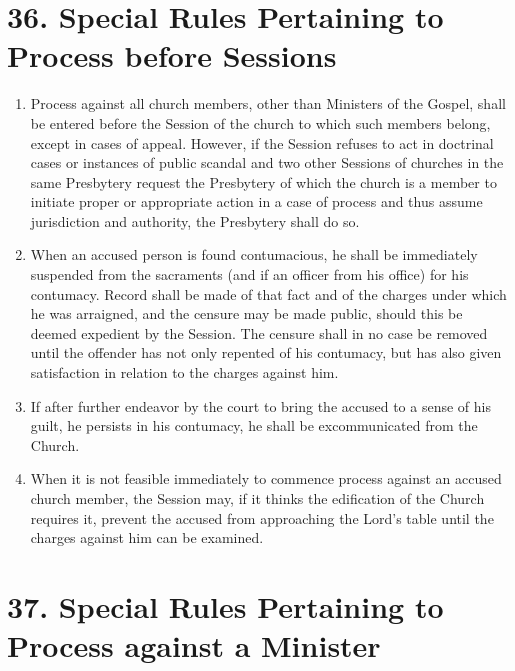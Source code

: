 \documentclass[
]{book}
\providecommand{\tightlist}{%
  \setlength{\itemsep}{0pt}\setlength{\parskip}{0pt}}
\begin{document}
\hypertarget{special-rules-pertaining-to-process-before-sessions}{%
\section*{36. Special Rules Pertaining to Process before Sessions}\label{special-rules-pertaining-to-process-before-sessions}}

\protect\hypertarget{chapter-slug-36-special-rules-pertaining-to-process-before-sessions}{\href{}{}}

\begin{enumerate}
\def\labelenumi{\arabic{enumi}.}
\tightlist
\item
  \protect\hypertarget{36}{\href{}{}}Process against all church members, other than Ministers of the Gospel, shall be entered before the Session of the church to which such members belong, except in cases of appeal. However, if the Session refuses to act in doctrinal cases or instances of public scandal and two other Sessions of churches in the same Presbytery request the Presbytery of which the church is a member to initiate proper or appropriate action in a case of process and thus assume jurisdiction and authority, the Presbytery shall do so.
\item
  \protect\hypertarget{36.2}{\href{}{}}When an accused person is found contumacious, he shall be immediately suspended from the sacraments (and if an officer from his office) for his contumacy. Record shall be made of that fact and of the charges under which he was arraigned, and the censure may be made public, should this be deemed expedient by the Session. The censure shall in no case be removed until the offender has not only repented of his contumacy, but has also given satisfaction in relation to the charges against him.
\item
  \protect\hypertarget{36.3}{\href{}{}}If after further endeavor by the court to bring the accused to a sense of his guilt, he persists in his contumacy, he shall be excommunicated from the Church.
\item
  When it is not feasible immediately to commence process against an accused church member, the Session may, if it thinks the edification of the Church requires it, prevent the accused from approaching the Lord's table until the charges against him can be examined.
\end{enumerate}

\hypertarget{special-rules-pertaining-to-process-against-a-minister}{%
\section*{37. Special Rules Pertaining to Process against a Minister}\label{special-rules-pertaining-to-process-against-a-minister}}
\end{document}

